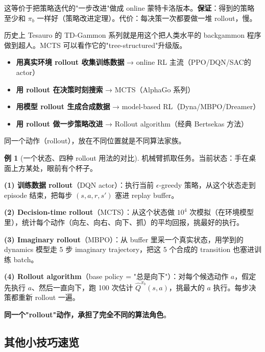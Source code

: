 \documentclass[11pt,a4paper]{article}
\theoremstyle{definition}
\newtheorem{example}{例}[section]
\begin{document}
这等价于把策略迭代的"一步改进"做成 online 蒙特卡洛版本。\textbf{保证}：得到的策略至少和 $\pi_b$ 一样好（策略改进定理）。代价：每决策一次都要做一堆 rollout，慢。

历史上 Tesauro 的 TD-Gammon 系列就是用这个把人类水平的 backgammon 程序做到超人。MCTS 可以看作它的"tree-structured"升级版。

\begin{plainwords}[一句话总结四种用法]
\begin{itemize}
\item \textbf{用真实环境 rollout 收集训练数据} → online RL 主流（PPO/DQN/SAC的actor）
\item \textbf{用 rollout 在决策时刻搜索} → MCTS（AlphaGo 系列）
\item \textbf{用模型 rollout 生成合成数据} → model-based RL（Dyna/MBPO/Dreamer）
\item \textbf{用 rollout 做一步策略改进} → Rollout algorithm（经典 Bertsekas 方法）
\end{itemize}

同一个动作（rollout），放在不同位置就是不同算法家族。
\end{plainwords}

\begin{example}[一个状态、四种 rollout 用法的对比]
机械臂抓取任务。当前状态：手在桌面上方某处，眼前有个杯子。

\textbf{(1) 训练数据 rollout}（DQN actor）：执行当前 $\epsilon$-greedy 策略，从这个状态走到 episode 结束，把每步 $(s, a, r, s')$ 塞进 replay buffer。

\textbf{(2) Decision-time rollout}（MCTS）：从这个状态做 $10^4$ 次模拟（在环境模型里），统计每个动作（向左、向右、向下、抓）的平均回报，挑最好的执行。

\textbf{(3) Imaginary rollout}（MBPO）：从 buffer 里采一个真实状态，用学到的 dynamics 模型走 5 步 imaginary trajectory，把这 5 个合成的 transition 也塞进训练 batch。

\textbf{(4) Rollout algorithm}（base policy = "总是向下"）：对每个候选动作 $a$，假定先执行 $a$、然后一直向下，跑 100 次估计 $\hat Q^{\pi_b}(s, a)$，挑最大的 $a$ 执行。每步决策都重新 rollout 一遍。

\textbf{同一个"rollout"动作，承担了完全不同的算法角色}。
\end{example}

\subsection{其他小技巧速览}
\end{document}
